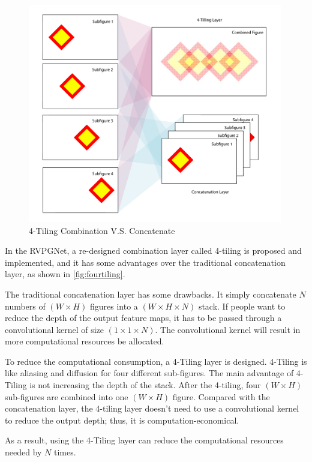 \begin{spacing}{1.5}
\begin{figure}[ht]
\centering
\includegraphics[width=0.99\textwidth, fbox]{Chapter3/fourtiling.pdf}
\caption{4-Tiling Combination V.S. Concatenate}
\label{fig:fourtiling} 
\end{figure}

In the RVPGNet, a re-designed combination layer called 4-tiling is proposed and implemented, and it has some advantages over the traditional concatenation layer, as shown in \autoref{fig:fourtiling}.

The traditional concatenation layer has some drawbacks. It simply concatenate $N$ numbers of $(W \times H)$ figures into a $(W \times H \times N)$ stack. If people want to reduce the depth of the output feature maps, it has to be passed through a convolutional kernel of size $(1 \times 1 \times N)$. The convolutional kernel will result in more computational resources be allocated.

To reduce the computational consumption, a 4-Tiling layer is designed. 4-Tiling is like aliasing and diffusion for four different sub-figures. The main advantage of 4-Tiling is not increasing the depth of the stack. After the 4-tiling, four $(W \times H)$ sub-figures are combined into one $(W \times H)$ figure. Compared with the concatenation layer, the 4-tiling layer doesn't need to use a convolutional kernel to reduce the output depth; thus, it is computation-economical.

As a result, using the 4-Tiling layer can reduce the computational resources needed by $N$ times.


\end{spacing}

